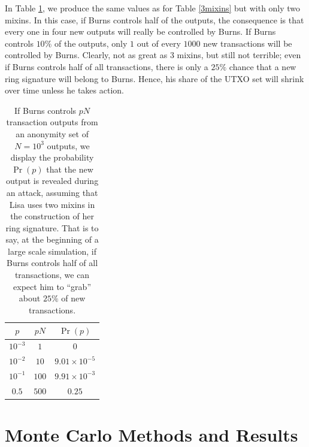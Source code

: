 \documentclass{mrl}
\begin{document}
In Table \ref{2mixins}, we produce the same values as for Table \ref{3mixins} but with only two mixins. In this case, if Burns controls half of the outputs, the consequence is that every one in four new outputs will really be controlled by Burns. If Burns controls $10\%$ of the outputs, only $1$ out of every $1000$ new transactions will be controlled by Burns. Clearly, not as great as $3$ mixins, but still not terrible; even if Burns controls half of all transactions, there is only a $25\%$ chance that a new ring signature will belong to Burns. Hence, his share of the UTXO set will shrink over time unless he takes action.

\begin{table}[!h]
\begin{center}
\begin{tabular}{c|c|c}
$p$ & $pN$ & $\Pr(p)$ \\ \hline
$10^{-3}$ & $1$ & $0$ \\
$10^{-2}$ & $10$ & $9.01\times 10^{-5}$ \\
$10^{-1}$ & $100$ & $9.91 \times 10^{-3}$\\
$0.5$ & $500$ & $0.25$ \\
\end{tabular}
\end{center}
\caption{If Burns controls $pN$ transaction outputs from an anonymity set of $N=10^3$ outputs, we display the probability $\Pr(p)$ that the new output is revealed during an attack, assuming that Lisa uses two mixins in the construction of her ring signature. That is to say, at the beginning of a large scale simulation, if Burns controls half of all transactions, we can expect him to ``grab'' about $25\%$ of new transactions.}

\label{2mixins}
\end{table}

\section{Monte Carlo Methods and Results}
\end{document}
